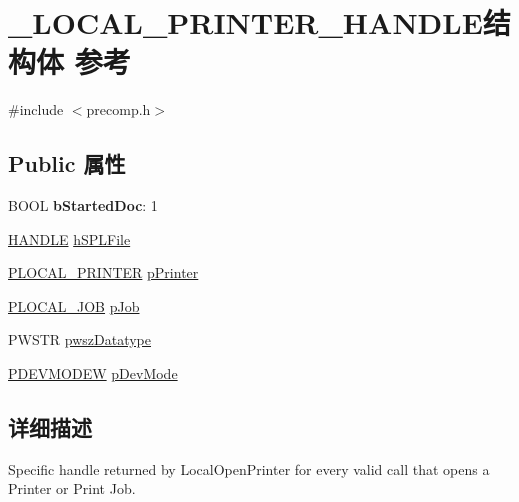 \hypertarget{struct___l_o_c_a_l___p_r_i_n_t_e_r___h_a_n_d_l_e}{}\section{\+\_\+\+L\+O\+C\+A\+L\+\_\+\+P\+R\+I\+N\+T\+E\+R\+\_\+\+H\+A\+N\+D\+L\+E结构体 参考}
\label{struct___l_o_c_a_l___p_r_i_n_t_e_r___h_a_n_d_l_e}


{\ttfamily \#include $<$precomp.\+h$>$}

\subsection*{Public 属性}
\begin{DoxyCompactItemize}
\item 
\mbox{\label{struct___l_o_c_a_l___p_r_i_n_t_e_r___h_a_n_d_l_e_aaa39d3536f3f5c97a50d1d98c91c66ff}} 
B\+O\+OL {\bfseries b\+Started\+Doc}\+: 1
\item 
\hyperlink{interfacevoid}{H\+A\+N\+D\+LE} \hyperlink{struct___l_o_c_a_l___p_r_i_n_t_e_r___h_a_n_d_l_e_ac45b57ac1a5c552ae6910419881e5067}{h\+S\+P\+L\+File}
\item 
\hyperlink{struct___l_o_c_a_l___p_r_i_n_t_e_r}{P\+L\+O\+C\+A\+L\+\_\+\+P\+R\+I\+N\+T\+ER} \hyperlink{struct___l_o_c_a_l___p_r_i_n_t_e_r___h_a_n_d_l_e_a308a9179f288674e32e6e2764025ff36}{p\+Printer}
\item 
\hyperlink{struct___l_o_c_a_l___j_o_b}{P\+L\+O\+C\+A\+L\+\_\+\+J\+OB} \hyperlink{struct___l_o_c_a_l___p_r_i_n_t_e_r___h_a_n_d_l_e_aa613734cd53abf925983a2a06f7d2b98}{p\+Job}
\item 
P\+W\+S\+TR \hyperlink{struct___l_o_c_a_l___p_r_i_n_t_e_r___h_a_n_d_l_e_af402420bacad53674d38dc8ca8b2ed3f}{pwsz\+Datatype}
\item 
\hyperlink{struct__devicemode_w}{P\+D\+E\+V\+M\+O\+D\+EW} \hyperlink{struct___l_o_c_a_l___p_r_i_n_t_e_r___h_a_n_d_l_e_af0da48e1a7c6725e0cb4b5dc10391ef1}{p\+Dev\+Mode}
\end{DoxyCompactItemize}


\subsection{详细描述}
Specific handle returned by Local\+Open\+Printer for every valid call that opens a Printer or Print Job. 

